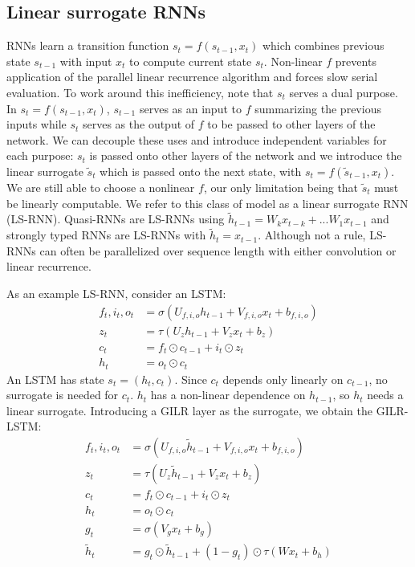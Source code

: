 \documentclass{article}
\begin{document}
\subsection{Linear surrogate RNNs}
\label{sec:ls-rnns}
RNNs learn a transition function $s_t = f(s_{t-1}, x_t)$ which combines previous
state $s_{t-1}$ with input $x_t$ to compute current state $s_t$. Non-linear $f$
prevents application of the parallel linear recurrence algorithm and forces slow
serial evaluation. To work around this inefficiency, note that $s_t$ serves a
dual purpose. In $s_t = f(s_{t-1}, x_t)$, $s_{t-1}$ serves as an input to $f$
summarizing the previous inputs while $s_t$ serves as the output of $f$ to be
passed to other layers of the network. We can decouple these uses and introduce
independent variables for each purpose: \(s_t\) is passed onto other layers of the network
and we introduce the linear surrogate \(\tilde{s}_t\) which is passed onto the
next state, with \(s_t = f(\tilde{s}_{t-1}, x_t)\). We are still able to choose a 
nonlinear \(f\), our only limitation being that \(\tilde{s}_t\) must be linearly
computable.  We refer to this class of model as a linear surrogate RNN
(LS-RNN). Quasi-RNNs \cite{bradbury2017quasi} are LS-RNNs using $\tilde{h}_{t-1}
= W_k x_{t-k} + ... W_1 x_{t-1}$ and strongly typed
RNNs\cite{balduzzi2016strongly} are LS-RNNs with $\tilde{h}_t=x_{t-1}$. Although
not a rule, LS-RNNs can often be parallelized over sequence length with either
convolution or linear recurrence.

As an example LS-RNN, consider an LSTM:
\begin{align*} f_t, i_t, o_t &= \sigma(U_{f,i,o} h_{t-1} + V_{f,i,o} x_t +
b_{f,i,o}) \\ z_t &= \tau(U_z h_{t-1} + V_z x_t + b_z) \\ c_t &= f_t \odot
c_{t-1} + i_t \odot z_t \\ h_t &= o_t \odot c_t
\end{align*} An LSTM has state $s_t = (h_t, c_t)$. Since $c_t$ depends only
linearly on $c_{t-1}$, no surrogate is needed for $c_t$. $h_t$ has a non-linear
dependence on $h_{t-1}$, so $h_t$ needs a linear surrogate. Introducing a GILR layer as
the surrogate, we obtain the GILR-LSTM:
\begin{align*} f_t, i_t, o_t &= \sigma(U_{f,i,o} \tilde{h}_{t-1} + V_{f,i,o} x_t
+ b_{f,i,o}) \\ z_t &= \tau(U_z \tilde{h}_{t-1} + V_z x_t + b_z) \\ c_t &= f_t
\odot c_{t-1} + i_t \odot z_t \\ h_t &= o_t \odot c_t \\ g_t &= \sigma(V_g x_t +
b_g) \\ \tilde{h}_t &= g_t \odot \tilde{h}_{t-1} + (1-g_t)\odot \tau(Wx_t + b_h)
\end{align*}
\end{document}
